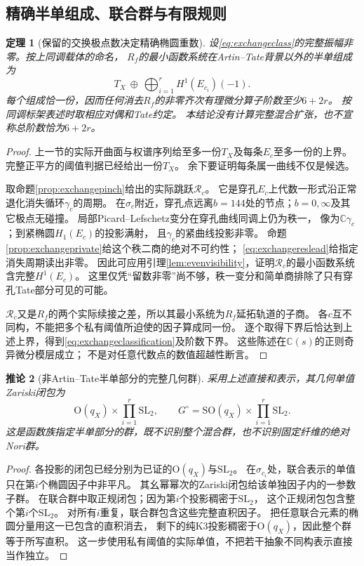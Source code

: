\documentclass[11pt,a4paper]{ctexart}
\theoremstyle{cnplain}\newtheorem{theorem}{定理}[section]
\newtheorem{corollary}[theorem]{推论}
\theoremstyle{definition}\newtheorem{definition}[theorem]{定义}
\theoremstyle{remark}\newtheorem{remark}[theorem]{注}
\begin{document}
\subsection{精确半单组成、联合群与有限规则}
\begin{theorem}[保留的交换极点数决定精确椭圆重数]\label{thm:exchangeclassification}
设\eqref{eq:exchangeclass}的完整振幅非零。按上同调载体的命名，
$R_f$的最小函数系统在Artin--Tate背景以外的半单组成为
\begin{equation}\label{eq:exchangeclassification}
 T_X\ \oplus\ \bigoplus_{i=1}^{r}H^1(E_{c_i})(-1).
\end{equation}
每个组成恰一份，因而任何消去$R_f$的非零齐次有理微分算子阶数至少$6+2r$。
按同调标架表述时取相应对偶和Tate约定。
本结论没有计算完整混合扩张，也不宣称总阶数恰为$6+2r$。
\end{theorem}
\begin{proof}
上一节的实际开曲面与权谱序列给至多一份$T_X$及每条$E_c$至多一份的上界。
完整正平方的阈值判据已经给出一份$T_X$。
余下要证明每条属一曲线不仅是候选。

取命题\ref{prop:exchangepinch}给出的实际跳跃$\mathcal R_c$。
它是穿孔$E_c$上代数一形式沿正常退化消失循环$\gamma_c$的周期。
在$\sigma_c$附近，穿孔点远离$b=144$处的节点；$b=0,\infty$及其它极点无碰撞。
局部Picard--Lefschetz变分在穿孔曲线同调上仍为秩一，
像为$\mathbb C\gamma_c$；到紧椭圆$H_1(E_c)$的投影满射，
且$\gamma_c$的紧曲线投影非零。
命题\ref{prop:exchangeprivate}给这个秩二商的绝对不可约性；
\eqref{eq:exchangereslead}给指定消失周期读出非零。
因此可应用引理\ref{lem:evenvisibility}，证明$\mathcal R_c$的最小函数系统含完整$H^1(E_c)$。
这里仅凭“留数非零”尚不够，秩一变分和简单商排除了只有穿孔Tate部分可见的可能。

$\mathcal R_c$又是$R_f$的两个实际续接之差，所以其最小系统为$R_f$延拓轨道的子商。
各$c$互不同构，不能把多个私有阈值所迫使的因子算成同一份。
逐个取得下界后恰达到上述上界，得到\eqref{eq:exchangeclassification}及阶数下界。
这些陈述在$\mathbb C(s)$的正则奇异微分模层成立；
不是对任意代数点的数值超越性断言。
\end{proof}

\begin{corollary}[非Artin--Tate半单部分的完整几何群]\label{cor:exchangegroup}
采用上述直接和表示，其几何单值Zariski闭包为
\[
 \mathrm O(q_X)\times\prod_{i=1}^{r}\mathrm{SL}_2 ,
 \qquad
 G^\circ=\mathrm{SO}(q_X)\times\prod_{i=1}^{r}\mathrm{SL}_2 .
\]
这是函数族指定半单部分的群，既不识别整个混合群，也不识别固定纤维的绝对Nori群。
\end{corollary}
\begin{proof}
各投影的闭包已经分别为已证的$\mathrm O(q_X)$与$\mathrm{SL}_2$。
在$\sigma_{c_i}$处，联合表示的单值只在第$i$个椭圆因子中非平凡。
其幺幂幂次的Zariski闭包给该单独因子内的一参数子群。
在联合群中取正规闭包；因为第$i$个投影稠密于$\mathrm{SL}_2$，
这个正规闭包包含整个第$i$个$\mathrm{SL}_2$。
对所有$i$重复，联合群包含这些完整直积因子。
把任意联合元素的椭圆分量用这一已包含的直积消去，
剩下的纯K3投影稠密于$\mathrm O(q_X)$，因此整个群等于所写直积。
这一步使用私有阈值的实际单值，不把若干抽象不同构表示直接当作独立。
\end{proof}
\end{document}
